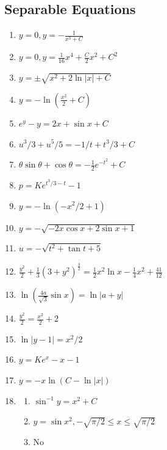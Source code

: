 \documentclass{article} \usepackage[margin=1in]{geometry}
\begin{document}
\subsection{Separable Equations}
\begin{enumerate}
	\item $y=0,y=-\frac{1}{x^3+C}$
	\item $y=0,y=\frac{1}{16}x^4+\frac{C}{2}x^2+C^2$
	\item $y=\pm\sqrt{x^2+2\ln|x|+C}$
	\item $y=-\ln\left(\frac{x^2}{2}+C\right)$
	\item $e^y-y=2x+\sin x+C$
	\item $u^3/3+u^5/5=-1/t+t^3/3+C$
	\item $\theta\sin\theta+\cos\theta=-\frac{1}{2}e^{-t^2}+C$
	      \setcounter{enumi}{8}
	\item $p=Ke^{t^3/3-t}-1$
	      \setcounter{enumi}{10}
	\item $y=-\ln(-x^2/2+1)$
	\item $y=-\sqrt{-2x\cos x+2\sin x+1}$
	\item $u=-\sqrt{t^2+\tan t+5}$
	      \setcounter{enumi}{14}
	\item $\frac{y^2}{2}+\frac{1}{3}\left(3+y^2\right)^\frac{3}{2}=
		      \frac{1}{2}x^2\ln x-\frac{1}{4}x^2+\frac{41}{12}$
	      \setcounter{enumi}{16}
	\item $\ln\left(\frac{4a}{\sqrt{3}}\sin x\right)=\ln|a+y|$
	      \setcounter{enumi}{18}
	\item $\frac{y^2}{2}=\frac{x^2}{2}+2$
	\item $\ln|y-1|=x^2/2$
	\item $y=Ke^x-x-1$
	\item $y=-x\ln(C-\ln|x|)$
	\item \begin{enumerate}
		      \item $\sin^{-1}y=x^2+C$
		      \item $y=\sin x^2,-\sqrt{\pi/2}\le x\le \sqrt{\pi/2}$
		      \item No
	      \end{enumerate}
\end{enumerate}
\end{document}

